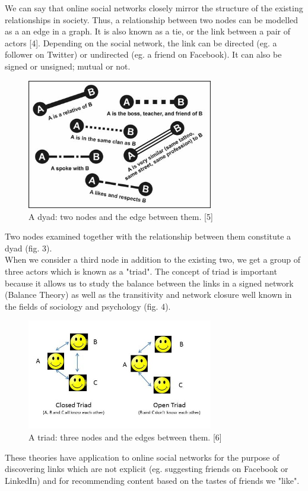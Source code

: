 \documentclass[conference,letterpaper]{IEEEtran}
\begin{document}
We can say that online social networks closely mirror the structure of the existing relationships in society.
Thus, a relationship between two nodes can be modelled as a an edge in a graph. It is also known as a tie, or
the link between a pair of actors [4]. Depending on the social network, the link can be directed (eg. a follower
on Twitter) or undirected (eg. a friend on Facebook). It can also be signed or unsigned; mutual or not. \\
\begin{center}
\begin{figure}[hb]
\centering
\includegraphics[width=3.2in]{f03}
\caption{
A dyad: two nodes and the edge between them. [5]
}
\label{fig_sim3}
\end{figure}
\end{center}
Two nodes examined together with the relationship between them constitute a dyad (fig. 3). \\
When we consider a third node in addition to the existing two, we get a group of three actors which is known 
as a "triad". The concept of triad is important because it allows us to study the balance between the links in a
signed network (Balance Theory) as well as the transitivity and network closure well known in the fields of
sociology and psychology (fig. 4).\\
\begin{center}
\begin{figure}[hb]
\centering
\includegraphics[width=3.2in]{open-triad}
\caption{
A triad: three nodes and the edges between them. [6]
}
\label{fig_sim4}
\end{figure}
\end{center}
These theories have application to online social networks for the purpose of discovering links which are not
explicit (eg. suggesting friends on Facebook or LinkedIn) and for recommending content based on the tastes of friends we "like".\\
\end{document}

